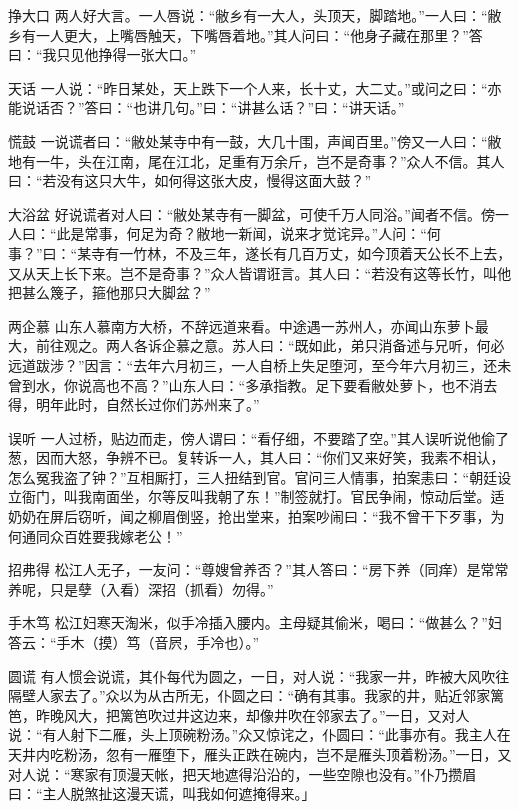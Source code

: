 \documentclass[12pt,UTF8]{ctexbook}
\begin{document}
挣大口
两人好大言。一人唇说：“敝乡有一大人，头顶天，脚踏地。”一人曰：“敝乡有一人更大，上嘴唇触天，下嘴唇着地。”其人问曰：“他身子藏在那里？”答曰：“我只见他挣得一张大口。”

天话
一人说：“昨日某处，天上跌下一个人来，长十丈，大二丈。”或问之曰：“亦能说话否？”答曰：“也讲几句。”曰：“讲甚么话？”曰：“讲天话。”

慌鼓
一说谎者曰：“敝处某寺中有一鼓，大几十围，声闻百里。”傍又一人曰：“敝地有一牛，头在江南，尾在江北，足重有万余斤，岂不是奇事？”众人不信。其人曰：“若没有这只大牛，如何得这张大皮，慢得这面大鼓？”

大浴盆
好说谎者对人曰：“敝处某寺有一脚盆，可使千万人同浴。”闻者不信。傍一人曰：“此是常事，何足为奇？敝地一新闻，说来才觉诧异。”人问：“何事？”曰：“某寺有一竹林，不及三年，遂长有几百万丈，如今顶着天公长不上去，又从天上长下来。岂不是奇事？”众人皆谓诳言。其人曰：“若没有这等长竹，叫他把甚么篾子，箍他那只大脚盆？”

两企慕
山东人慕南方大桥，不辞远道来看。中途遇一苏州人，亦闻山东萝卜最大，前往观之。两人各诉企慕之意。苏人曰：“既如此，弟只消备述与兄听，何必远道跋涉？”因言：“去年六月初三，一人自桥上失足堕河，至今年六月初三，还未曾到水，你说高也不高？”山东人曰：“多承指教。足下要看敝处萝卜，也不消去得，明年此时，自然长过你们苏州来了。”

误听
一人过桥，贴边而走，傍人谓曰：“看仔细，不要踏了空。”其人误听说他偷了葱，因而大怒，争辨不已。复转诉一人，其人曰：“你们又来好笑，我素不相认，怎么冤我盗了钟？”互相厮打，三人扭结到官。官问三人情事，拍案恚曰：“朝廷设立衙门，叫我南面坐，尔等反叫我朝了东！”制签就打。官民争闹，惊动后堂。适奶奶在屏后窃听，闻之柳眉倒竖，抢出堂来，拍案吵闹曰：“我不曾干下歹事，为何通同众百姓要我嫁老公！”

招弗得
松江人无子，一友问：“尊嫂曾养否？”其人答曰：“房下养（同痒）是常常养呢，只是孽（入看）深招（抓看）勿得。”

手木笃
松江妇寒天淘米，似手冷插入腰内。主母疑其偷米，喝曰：“做甚么？”妇答云：“手木（摸）笃（音屄，手冷也）。”

圆谎
有人惯会说谎，其仆每代为圆之，一日，对人说：“我家一井，昨被大风吹往隔壁人家去了。”众以为从古所无，仆圆之曰：“确有其事。我家的井，贴近邻家篱笆，昨晚风大，把篱笆吹过井这边来，却像井吹在邻家去了。”一日，又对人说：“有人射下二雁，头上顶碗粉汤。”众又惊诧之，仆圆曰：“此事亦有。我主人在天井内吃粉汤，忽有一雁堕下，雁头正跌在碗内，岂不是雁头顶着粉汤。”一日，又对人说：“寒家有顶漫天帐，把天地遮得沿沿的，一些空隙也没有。”仆乃攒眉曰：“主人脱煞扯这漫天谎，叫我如何遮掩得来。」

\backmatter
\end{document}
